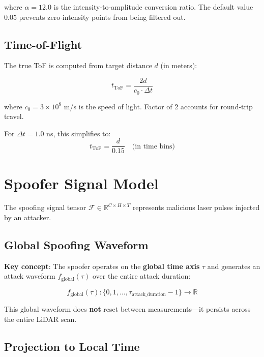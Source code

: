 \documentclass[11pt]{article}
\begin{document}
where $\alpha = 12.0$ is the intensity-to-amplitude conversion ratio. The default value $0.05$ prevents zero-intensity points from being filtered out.

\subsection{Time-of-Flight}

The true ToF is computed from target distance $d$ (in meters):

\begin{equation}
t_{\text{ToF}} = \frac{2d}{c_0 \cdot \Delta t}
\end{equation}

where $c_0 = 3 \times 10^8$ m/s is the speed of light. Factor of 2 accounts for round-trip travel.

For $\Delta t = 1.0$ ns, this simplifies to:
\begin{equation}
t_{\text{ToF}} = \frac{d}{0.15} \quad \text{(in time bins)}
\end{equation}

\section{Spoofer Signal Model}

The spoofing signal tensor $\bm{\mathcal{F}} \in \mathbb{R}^{C \times H \times T}$ represents malicious laser pulses injected by an attacker.

\subsection{Global Spoofing Waveform}

\textbf{Key concept}: The spoofer operates on the \textbf{global time axis} $\tau$ and generates an attack waveform $f_{\text{global}}(\tau)$ over the entire attack duration:

\begin{equation}
f_{\text{global}}(\tau): \{0, 1, \ldots, \tau_{\text{attack\_duration}}-1\} \rightarrow \mathbb{R}
\end{equation}

This global waveform does \textbf{not} reset between measurements—it persists across the entire LiDAR scan.

\subsection{Projection to Local Time}
\end{document}
